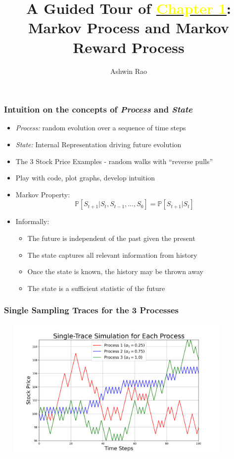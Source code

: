 \documentclass[handout]{beamer}
\title[Markov Process Chapter]{A Guided Tour of \href{http://stanford.edu/~ashlearn/RLForFinanceBook/book.pdf}{\underline{\textcolor{yellow}{Chapter 1}}}: \\  Markov Process and Markov Reward Process} %
\author{Ashwin Rao} %
\institute[Stanford] %
{ICME, Stanford University
}
\date %
\begin{document}
\lstset{language=Python}  
\begin{frame}
\titlepage %
\end{frame}


\begin{frame}
\frametitle{Intuition on the concepts of {\em Process} and {\em State}}
\pause
\begin{itemize}[<+->]
\item {\em Process:} random evolution over a sequence of time steps
\item {\em State:} Internal Representation driving future evolution
\item The 3 Stock Price Examples - random walks with ``reverse pulls''
\item Play with code, plot graphs, develop intuition
\item Markov Property:
$$\mathbb{P}[S_{t+1}|S_t, S_{t-1}, \ldots, S_0] = \mathbb{P}[S_{t+1}|S_t]$$
\item Informally:
\begin{itemize}
\item The future is independent of the past given the present
\item The state captures all relevant information from history
\item Once the state is known, the history may be thrown away
\item The state is a sufficient statistic of the future
\end{itemize}
\end{itemize}
\end{frame}


\begin{frame}
\frametitle{Single Sampling Traces for the 3 Processes}
\includegraphics[width=12cm, height=7cm]{single_traces.png}
\end{frame}
\end{document}

